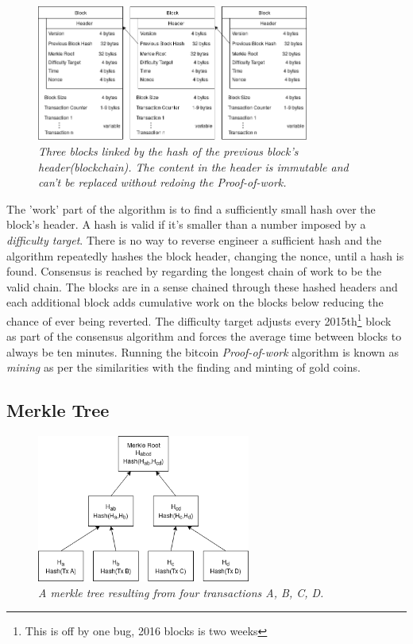 \begin{figure}[!htb]
	\hspace*{-0.4cm} 
	\centering
	\includegraphics[width=9cm]{images/blockchain.png}
	\caption{\textit{Three blocks linked by the hash of the previous block's header(\gls{blockchain}). The content in the header is immutable and can't be replaced without redoing the \textit{Proof-of-work}.
	}}
	\label{fig:blockchain}
	\hspace{2mm} 
\end{figure}

The 'work' part of the algorithm is to find a sufficiently small hash over the block's header. A hash is valid if it's smaller than a number imposed by a \textit{difficulty target}. There is no way to reverse engineer a sufficient hash and the algorithm repeatedly hashes the block header, changing the nonce, until a hash is found. Consensus is reached by regarding the longest chain of work to be the valid chain. The blocks are in a sense chained through these hashed headers and each additional block adds cumulative work on the blocks below reducing the chance of ever being reverted. The difficulty target adjusts every 2015th\footnote{This is off by one bug, 2016 blocks is two weeks} block~\cite{repository:bitcoin} as part of the consensus algorithm and forces the average time between blocks to always be ten minutes. Running the bitcoin \textit{Proof-of-work} algorithm is known as \textit{mining} as per the similarities with the finding and minting of gold coins.

\subsection{Merkle Tree}

\begin{figure}[!htb]
	
	\centering
	\includegraphics[width=7cm]{images/merkle.png}
	\caption{\textit{A merkle tree resulting from four transactions A, B, C, D.
	}}
	\label{fig:merkle:tree}
	
\end{figure}

